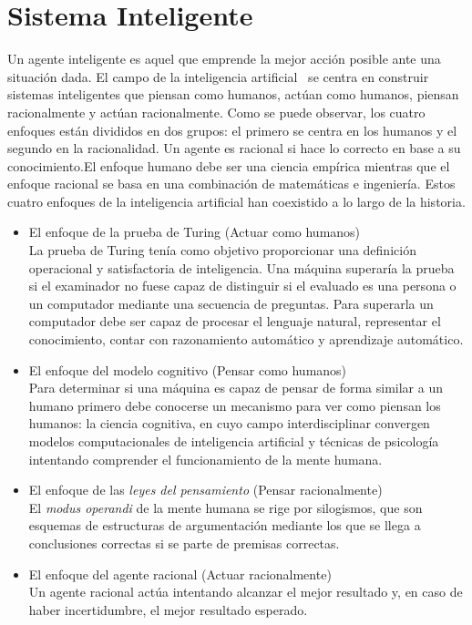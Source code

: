 \section{Sistema Inteligente}
Un agente inteligente es aquel que emprende la mejor acción posible ante una situación dada. El campo de la inteligencia artificial~\cite{Russ06} se centra en construir sistemas inteligentes que piensan como humanos, actúan como humanos, piensan racionalmente y actúan racionalmente. Como se puede observar, los cuatro enfoques están divididos en dos grupos: el primero se centra en los humanos y el segundo en la racionalidad. Un agente es racional si hace lo correcto en base a su conocimiento.El enfoque humano debe ser una ciencia empírica mientras que el enfoque racional se basa en una combinación de matemáticas e ingeniería. Estos cuatro enfoques de la inteligencia artificial han coexistido a lo largo de la historia.\\
\begin{itemize}
\item{El enfoque de la prueba de Turing (Actuar como humanos)}\\

  La prueba de Turing tenía como objetivo proporcionar una definición operacional y satisfactoria de inteligencia. Una máquina superaría la prueba si el examinador no fuese capaz de distinguir si el evaluado es una persona o un computador mediante una secuencia de preguntas. Para superarla un computador debe ser capaz de procesar el lenguaje natural, representar el conocimiento, contar con razonamiento automático y aprendizaje automático.
\item{El enfoque del modelo cognitivo (Pensar como humanos)}\\

Para determinar si una máquina es capaz de pensar de forma similar a un humano primero debe conocerse un mecanismo para ver como piensan los humanos: la ciencia cognitiva, en cuyo campo interdisciplinar convergen modelos computacionales de inteligencia artificial y técnicas de psicología intentando comprender el funcionamiento de la mente humana.
\item{El enfoque de las \textit{leyes del pensamiento} (Pensar racionalmente)}\\

  El \textit{modus operandi} de la mente humana se rige por silogismos, que son esquemas de estructuras de argumentación mediante los que se llega a conclusiones correctas si se parte de premisas correctas.
\item{El enfoque del agente racional (Actuar racionalmente)}\\

  Un agente racional actúa intentando alcanzar el mejor resultado y, en caso de haber incertidumbre, el mejor resultado esperado.
\end{itemize}
